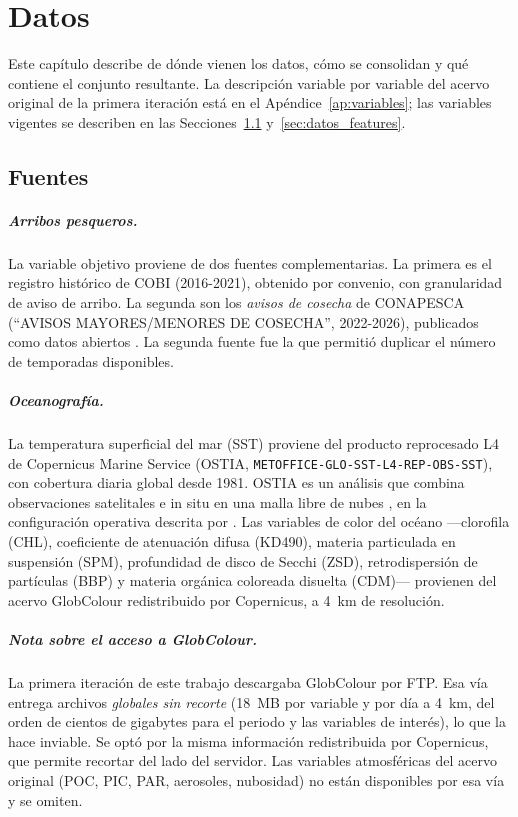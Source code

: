 \chapter{Datos}
\label{cap:datos}

Este capítulo describe de dónde vienen los datos, cómo se consolidan y qué contiene el conjunto
resultante. La descripción variable por variable del acervo original de la primera iteración está en el Apéndice~\ref{ap:variables}; las variables vigentes se describen en las Secciones~\ref{sec:datos_fuentes} y~\ref{sec:datos_features}.

\section{Fuentes}
\label{sec:datos_fuentes}

\paragraph{Arribos pesqueros.} La variable objetivo proviene de dos fuentes complementarias.
La primera es el registro histórico de COBI (2016-2021), obtenido por convenio, con
granularidad de aviso de arribo. La segunda son los \emph{avisos de cosecha} de CONAPESCA
(``AVISOS MAYORES/MENORES DE COSECHA'', 2022-2026), publicados como datos abiertos
\citep{conapesca_datos}. La segunda fuente fue la
que permitió duplicar el número de temporadas disponibles.

\paragraph{Oceanografía.} La temperatura superficial del mar (SST) proviene del producto
reprocesado L4 de Copernicus Marine Service (OSTIA,
\texttt{METOFFICE-GLO-SST-L4-REP-OBS-SST}), con cobertura diaria global desde 1981. OSTIA es un
análisis que combina observaciones satelitales e in situ en una malla libre de nubes
\citep{donlon2012}, en la configuración operativa descrita por \citet{good2020}. Las
variables de color del océano ---clorofila (CHL), coeficiente de atenuación difusa (KD490),
materia particulada en suspensión (SPM), profundidad de disco de Secchi (ZSD), retrodispersión
de partículas (BBP) y materia orgánica coloreada disuelta (CDM)--- provienen del acervo
GlobColour \citep{globcolour2020} redistribuido por Copernicus, a 4~km de resolución.

\paragraph{Nota sobre el acceso a GlobColour.} La primera iteración de este trabajo descargaba
GlobColour por FTP. Esa vía entrega archivos \emph{globales sin recorte} (18~MB por variable y
por día a 4~km, del orden de cientos de gigabytes para el periodo y las variables de interés),
lo que la hace inviable. Se optó por la misma información redistribuida por Copernicus, que
permite recortar del lado del servidor. Las variables atmosféricas del acervo original (POC,
PIC, PAR, aerosoles, nubosidad) no están disponibles por esa vía y se omiten.

